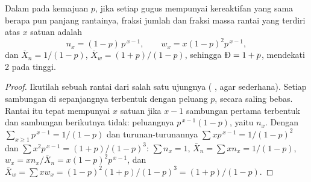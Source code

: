\begin{theorem}\label{thm:b2:polymer-synthesis:flory}
Dalam  pada kemajuan $p$, jika setiap gugus
mempunyai kereaktifan yang sama berapa pun panjang rantainya, fraksi jumlah
dan fraksi massa rantai yang terdiri atas $x$ satuan adalah
\begin{equation*}
n_x = (1-p)\,p^{\,x-1}, \qquad w_x = x(1-p)^2 p^{\,x-1},
\end{equation*}
dan $\bar X_n = 1/(1-p)$, $\bar X_w = (1+p)/(1-p)$, sehingga $\text{\DH} = 1 + p$,
mendekati 2 pada  tinggi.
\end{theorem}

\begin{proof}
Ikutilah sebuah rantai dari salah satu ujungnya ( , agar
sederhana). Setiap sambungan di sepanjangnya terbentuk dengan peluang $p$,
secara saling bebas. Rantai itu tepat mempunyai $x$ satuan jika $x-1$
sambungan pertama terbentuk dan sambungan berikutnya tidak: peluangnya
$p^{\,x-1}(1-p)$, yaitu $n_x$. Dengan $\sum_{x\ge1} p^{\,x-1} =
1/(1-p)$ dan turunan-turunannya $\sum x p^{\,x-1} = 1/(1-p)^2$ dan $\sum x^2 p^{\,x-1} = (1+p)/(1-p)^3$:
$\sum n_x = 1$, $\bar X_n = \sum x n_x = 1/(1-p)$, $w_x = x n_x/\bar X_n = x(1-p)^2p^{\,x-1}$, dan
$\bar X_w = \sum x w_x = (1-p)^2(1+p)/(1-p)^3 = (1+p)/(1-p)$.
\end{proof}

